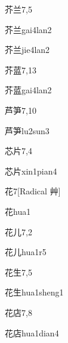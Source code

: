 \begin{entry}{芥兰}{7,5}
  \begin{phonetics}{芥兰}{gai4lan2}
  \end{phonetics}
  \begin{phonetics}{芥兰}{jie4lan2}
  \end{phonetics}
\end{entry}

\begin{entry}{芥蓝}{7,13}
  \begin{phonetics}{芥蓝}{gai4lan2}
  \end{phonetics}
\end{entry}

\begin{entry}{芦笋}{7,10}
  \begin{phonetics}{芦笋}{lu2sun3}
  \end{phonetics}
\end{entry}

\begin{entry}{芯片}{7,4}
  \begin{phonetics}{芯片}{xin1pian4}
  \end{phonetics}
\end{entry}

\begin{entry}{花}{7}[Radical 艸]
  \begin{phonetics}{花}{hua1}
  \end{phonetics}
\end{entry}

\begin{entry}{花儿}{7,2}
  \begin{phonetics}{花儿}{hua1r5}
  \end{phonetics}
\end{entry}

\begin{entry}{花生}{7,5}
  \begin{phonetics}{花生}{hua1sheng1}
  \end{phonetics}
\end{entry}

\begin{entry}{花店}{7,8}
  \begin{phonetics}{花店}{hua1dian4}
  \end{phonetics}
\end{entry}

